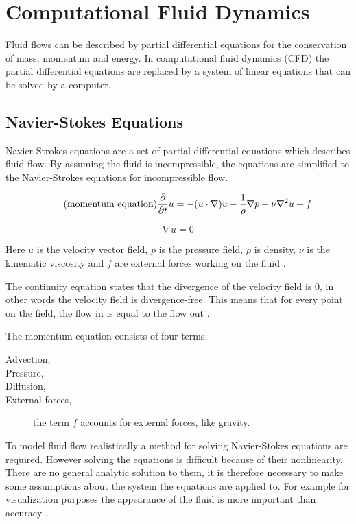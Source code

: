 \section{Computational Fluid Dynamics}

Fluid flows can be described by partial differential equations for the conservation 
of mass, momentum and energy. In computational fluid dynamics (CFD) the partial 
differential equations are replaced by a system of linear equations that can be 
solved by a computer. 

\subsection{Navier-Stokes Equations}

Navier-Strokes equations are a set of partial differential equations which describes 
fluid flow\cite{fluidDynamicsIntro}. By assuming the fluid is incompressible, 
the equations are simplified to the Navier-Strokes equations for incompressible 
flow\cite{originalSnowThesis}. 

\begin{equation} 
	\tag{momentum equation}
	\frac{\partial}{\partial t}u  = -(u \cdot \nabla)u - \frac{1}{\rho}\nabla p + \nu \nabla^2 u + f
\end{equation}

\begin{equation}
	\tag{continuity equation}
	\nabla u = 0
\end{equation}

Here $u$ is the velocity vector field, $p$ is the pressure field, $\rho$ is density,
$\nu$ is the kinematic viscosity and $f$ are external forces working on the fluid
\cite{gpuSnowThesis}. 

The continuity equation states that the divergence of the 
velocity field is 0, in other words the velocity field is divergence-free. This 
means that for every point on the field, the flow in is equal to the flow out
\cite{originalSnowThesis}. 

The momentum equation consists of four terms;
\begin{description}
	\item[Advection,] 
	\item[Pressure,]
	\item[Diffusion,]
	\item[External forces,] the term $f$ accounts for external forces, like gravity.
\end{description}

To model fluid flow realistically a method for solving Navier-Stokes equations are 
required. However solving the equations is difficult because of their nonlinearity. 
There are no general analytic solution to them, it is therefore necessary to make 
some assumptions about the system the equations are applied to. For example for 
visualization purposes the appearance of the fluid is more important than accuracy 
\cite{smokeAndFire}. 

